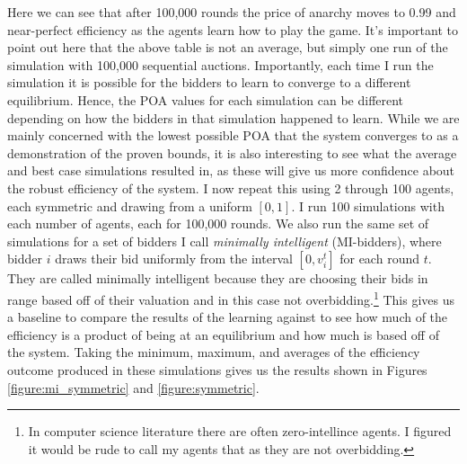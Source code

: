 \documentclass[12pt,twoside]{reedthesis}
\begin{document}
Here we can see that after 100,000 rounds the price of anarchy moves to 0.99 and near-perfect efficiency as the agents learn how to play the game. It's important to point out here that the above table is not an average, but simply one run of the simulation with 100,000 sequential auctions. Importantly, each time I run the simulation it is possible for the bidders to learn to converge to a different equilibrium. Hence, the POA values for each simulation can be different depending on how the bidders in that simulation happened to learn. While we are mainly concerned with the lowest possible POA that the system converges to as a demonstration of the proven bounds, it is also interesting to see what the average and best case simulations resulted in, as these will give us more confidence about the robust efficiency of the system. I now repeat this using 2 through 100 agents, each symmetric and drawing from a uniform $[0,1]$. I run 100 simulations with each number of agents, each for 100,000 rounds. We also run the same set of simulations for a set of bidders I call {\em minimally intelligent} (MI-bidders), where bidder $i$ draws their bid uniformly from the interval $[0,v_i^t]$ for each round $t$. They are called minimally intelligent because they are choosing their bids in range based off of their valuation and in this case not overbidding.\footnote{In computer science literature there are often zero-intellince agents. I figured it would be rude to call my agents that as they are not overbidding.} This gives us a baseline to compare the results of the learning against to see how much of the efficiency is a product of being at an equilibrium and how much is based off of the system. Taking the minimum, maximum, and averages of the efficiency outcome produced in these simulations gives us the results shown in Figures \ref{figure:mi_symmetric} and \ref{figure:symmetric}. 
\end{document}
